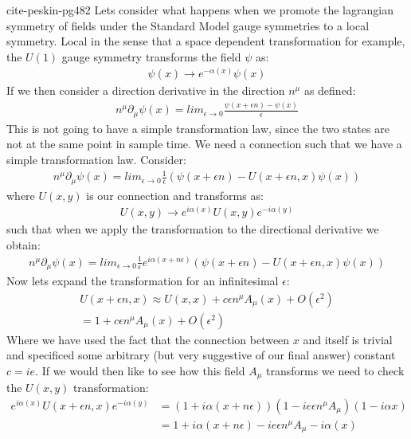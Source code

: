 cite-peskin-pg482
Lets consider what happens when we promote the lagrangian symmetry of fields under the Standard Model gauge symmetries
to a local symmetry. Local in the sense that a space dependent transformation   for example, the $U(1)$ gauge symmetry transforms the field $\psi$ as:
\begin{align*}
\psi(x) \rightarrow e^{- \alpha(x)} \psi(x)
\end{align*}
If we then consider a direction derivative in the direction $n^\mu$ as defined:
\begin{align*}
n^\mu \partial _\mu \psi (x) = lim_{\epsilon\rightarrow 0} \frac{\psi(x + \epsilon n) - \psi(x)}{\epsilon}
\end{align*}
This is not going to have a simple transformation law, since the two states are not at the same
point in sample time. We need a connection such that we have a simple transformation law. Consider:
\begin{align*}
n^\mu \partial _\mu \psi (x) = lim_{\epsilon\rightarrow 0} \frac{1}{\epsilon} \left ( \psi(x + \epsilon n) - U(x+\epsilon n, x) \psi(x) \right)
\end{align*}
where $U(x,y)$ is our connection and transforms as:
\begin{align*}
U(x,y) \rightarrow e^{i\alpha(x)} U(x,y) e^{-i\alpha (y)}
\end{align*}
such that when we apply the transformation  to the directional derivative we obtain:
\begin{align*}
n^\mu \partial _\mu \psi (x) = lim_{\epsilon\rightarrow 0} \frac{1}{\epsilon} e^{i\alpha(x+n\epsilon)} \left ( \psi(x + \epsilon n) - U(x+\epsilon n, x) \psi(x) \right)
\end{align*}
Now lets expand the transformation for an infinitesimal $\epsilon$:
\begin{align*}
U(x+\epsilon n, x) \approx U(x,x) + c\epsilon n^\mu A_\mu (x) + O(\epsilon^2)\\
= 1 + c\epsilon n^\mu A_\mu (x) + O(\epsilon^2)
\end{align*}
Where we have used the fact that the connection between $x$ and itself is trivial and specificed some arbitrary (but very suggestive of our final answer) constant $c = ie$.
If we would then like to see how this field $A_\mu$ transforms we need to check the $U(x,y)$ transformation:
\begin{align*}
e^{i\alpha(x)} U(x+\epsilon n,x) e^{-i\alpha (y)} &= (1 + i \alpha(x+n\epsilon)) (1-ie\epsilon n^\mu A_\mu)(1 - i \alpha x) \\
&= 1 + i \alpha (x+n\epsilon ) - ie \epsilon n^\mu A_\mu - i\alpha(x)
\end{align*}
